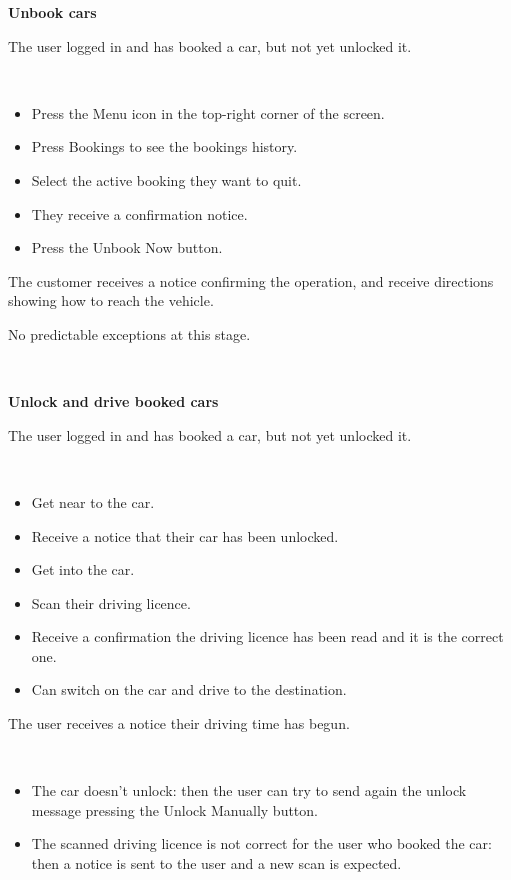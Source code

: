 \documentclass[11pt]{article} %
\begin{document}
\begin{description}[noitemsep,topsep=0pt,parsep=0pt,partopsep=0pt]
	\item[Name:] \textbf{Unbook cars}
	\item[Entry Conditions:] The user logged in and has booked a car, but not yet unlocked it.
	\item[Flow Of Events:] \hfill\
	\begin{itemize}
		\item Press the Menu icon in the top-right corner of the screen.
		\item Press Bookings to see the bookings history.
		\item Select the active booking they want to quit.
		\item They receive a confirmation notice.
		\item Press the Unbook Now button.
	\end{itemize}
	\item[Exit conditions:] The customer receives a notice confirming the operation, and receive directions showing how to reach the vehicle.
	\item[Exceptions:] No predictable exceptions at this stage.
\end{description}
\hfill\

\begin{description}[noitemsep,topsep=0pt,parsep=0pt,partopsep=0pt]
	\item[Name:] \textbf{Unlock and drive booked cars}
	\item[Entry Conditions:] The user logged in and has booked a car, but not yet unlocked it.
	\item[Flow Of Events:] \hfill\
	\begin{itemize}
		\item Get near to the car.
		\item Receive a notice that their car has been unlocked.
		\item Get into the car.
		\item Scan their driving licence.
		\item Receive a confirmation the driving licence has been read and it is the correct one.
		\item Can switch on the car and drive to the destination.
	\end{itemize}
	\item[Exit conditions:]  The user receives a notice their driving time has begun.
	\item[Exceptions:] \hfill\
	\begin{itemize}
		\item The car doesn't unlock: then the user can try to send again the unlock message pressing the Unlock Manually button.
		\item The scanned driving licence is not correct for the user who booked the car: then a notice is sent to the user and a new scan is expected.
	\end{itemize}
\end{description}
\hfill\
\end{document}
